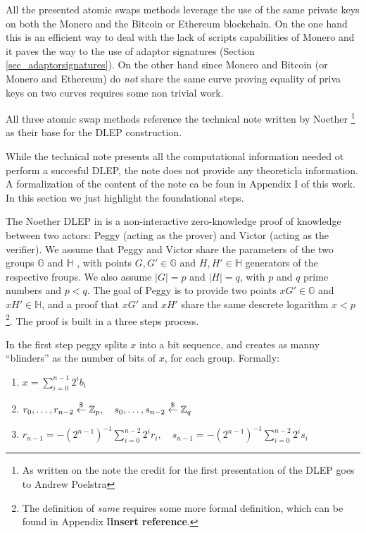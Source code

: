 \documentclass[runningheads]{llncs}
\newcommand{\getsrandom}{\overset{\tiny{\$}}{\leftarrow}}
\newcommand{\ggroup}{\mathbb{G}}
\newcommand{\hgroup}{\mathbb{H}}
\newcommand{\ggrouptxt}{$\mathbb{G}$ }
\newcommand{\hgrouptxt}{$\mathbb{H}$ }
\newcommand{\Zp}{\mathbb{Z}_p}
\newcommand{\Zq}{\mathbb{Z}_q}
\begin{document}
All the presented atomic swaps methods leverage the use of the same private keys on both the Monero and the Bitcoin or Ethereum blockchain. On the one hand this is an efficient way to deal with the lack of scripts capabilities of Monero and it paves the way to the use of adaptor signatures (Section \ref{sec_adaptorsignatures}). On the other hand since Monero and Bitcoin (or Monero and Ethereum) do \emph{not} share the same curve proving equality of priva keys on two curves requires some non trivial work.

All three atomic swap methods reference the technical note written by Noether \footnote{As written on the note the credit for the first presentation of the DLEP goes to Andrew Poelstra} \cite{dlep} as their base for the DLEP construction.

While the technical note presents all the computational information needed ot perform a succesful DLEP, the note does not provide any theoreticla information. A formalization of the content of the note ca be foun in Appendix I of this work. In this section we just highlight the foundational steps.

The Noether DLEP in \cite{dlep} is a non-interactive zero-knowledge proof of knowledge between two actors: Peggy (acting as the prover) and Victor (acting as the verifier). We assume that Peggy and Victor share the parameters of the two groups \ggrouptxt and \hgrouptxt, with points $G,G'\in\ggroup$ and $H,H' \in\hgroup$ generators of the respective froups. We also assume $|G|=p$ and $|H|=q$, with $p$ and $q$ prime numbers and $p<q$. The goal of Peggy is to provide two points $xG'\in\ggroup$ and $xH'\in\hgroup$, and a proof that $xG'$ and $xH'$ share the same descrete logarithm $x<p$\footnote{The definition of \emph{same} requires some more formal definition, which can be found in Appendix I\textbf{insert reference}.}. The proof is built in a three steps process.

In the first step peggy splits $x$ into a bit sequence, and creates as manny ``blinders'' as the number of bits of $x$, for each group. Formally:
\begin{enumerate}
    \item $x=\sum_{i=0}^{n-1} 2^ib_i$
    \item $r_0,\dots,r_{n-2}\getsrandom\Zp,\quad s_0,\dots,s_{n-2}\getsrandom\Zq$
    \item $r_{n-1}=-(2^{n-1})^{-1}\sum_{i=0}^{n-2} 2^ir_i,\quad s_{n-1}=-(2^{n-1})^{-1}\sum_{i=0}^{n-2} 2^is_i$
\end{enumerate}
\end{document}
